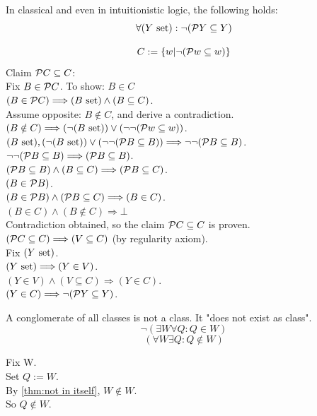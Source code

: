 \begin{theorem}
\label{thm:powerset not a subset}
In classical and even in intuitionistic logic, the following holds:
\[ \forall (Y\mathrm{\ set}): \neg(\mathcal{P} Y \subseteq Y)\]
\end{theorem}
\Proof
\noindent %
\[
C:=\{w|\neg(\mathcal{P} w \subseteq w)\}
\]
Claim $\mathcal{P} C \subseteq C$:\\
Fix $B\in \mathcal{P} C$. To show: $B\in C$\\
$(B\in \mathcal{P} C)\Longrightarrow (B\mathrm{\ set})\land(B\subseteq C)$.\\
Assume opposite: $B\notin C$, and derive a contradiction.\\
$(B\notin C) \Longrightarrow (\neg(B\mathrm{\ set}))\lor (\neg\neg(\mathcal{P} w\subseteq w))$.\\
$(B\mathrm{\ set}), (\neg(B\mathrm{\ set}))\lor (\neg\neg(\mathcal{P} B\subseteq B)) \Longrightarrow \neg\neg(\mathcal{P} B\subseteq B)$.\\
$\neg\neg(\mathcal{P} B\subseteq B)  \Longrightarrow (\mathcal{P} B\subseteq B)$.\\
$ (\mathcal{P} B\subseteq B) \land (B\subseteq C) \Longrightarrow (\mathcal{P} B\subseteq C)$.\\
$(B\in \mathcal{P} B)$.\\
$(B\in \mathcal{P} B)\land (\mathcal{P} B\subseteq C) \Longrightarrow (B\in C)$.\\
$(B\in C) \land (B\notin C)  \Longrightarrow \bot$\\
Contradiction obtained, so the claim $\mathcal{P} C \subseteq C$ is proven.\\
$(\mathcal{P} C \subseteq C)\Longrightarrow (V\subseteq C)$ (by regularity axiom).\\
Fix $(Y\mathrm{\ set})$.\\
$(Y\mathrm{\ set})\Longrightarrow (Y\in V)$.\\
$(Y\in V)\land (V\subseteq C) \Longrightarrow (Y\in C)$.\\
$(Y\in C)\Longrightarrow \neg(\mathcal{P} Y\subseteq Y)$.\\
\Done

\begin{theorem}
\label{thm:conglomerate of classes not class}
A conglomerate of all classes is not a class. It "does not exist as class".
\[
\neg (\exists W \forall Q: Q\in W)
\]
\[
(\forall W \exists Q: Q\notin W)
\]
\end{theorem}
\Proof
Fix W.\\
Set $Q:=W$.\\
By \ref{thm:not in itself}, $W\notin W$.\\
So $Q\notin W$.\\
\Done

